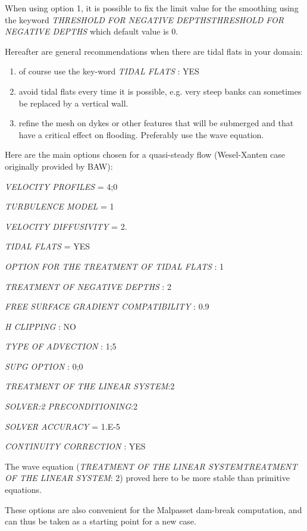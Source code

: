 \documentclass{article} %
\begin{document}
 When using option 1, it is possible to fix the limit value for the smoothing using the keyword \textit{THRESHOLD FOR NEGATIVE DEPTHSTHRESHOLD FOR NEGATIVE DEPTHS} which default value is 0.

 Hereafter are general recommendations when there are tidal flats in your domain:

\begin{enumerate}
\item  of course use the key-word \textit{TIDAL FLATS }: YES

\item  avoid tidal flats every time it is possible, e.g. very steep banks can sometimes be replaced by a vertical wall.

\item  refine the mesh on dykes or other features that will be submerged and that have a critical effect on flooding. Preferably use the wave equation.
\end{enumerate}

 Here are the main options chosen for a quasi-steady flow (Wesel-Xanten case originally provided by BAW):

 \textit{VELOCITY PROFILES} = 4;0

 \textit{TURBULENCE MODEL} = 1

 \textit{VELOCITY DIFFUSIVITY} = 2.

 \textit{TIDAL FLATS} = YES

 \textit{OPTION FOR THE TREATMENT OF TIDAL FLATS} : 1

 \textit{TREATMENT OF NEGATIVE DEPTHS} : 2

 \textit{FREE SURFACE GRADIENT COMPATIBILITY} : 0.9

 \textit{H CLIPPING} : NO

 \textit{TYPE OF ADVECTION} : 1;5

 \textit{SUPG OPTION} :       0;0

 \textit{TREATMENT OF THE LINEAR SYSTEM}:2

 \textit{SOLVER:2 PRECONDITIONING}:2

 \textit{SOLVER ACCURACY} = 1.E-5

 \textit{CONTINUITY CORRECTION} : YES

 The wave equation (\textit{TREATMENT OF THE LINEAR SYSTEMTREATMENT OF THE LINEAR SYSTEM}: 2) proved here to be more stable than primitive equations.

 These options are also convenient for the Malpasset dam-break computation, and can thus be taken as a starting point for a new case.
\end{document}
